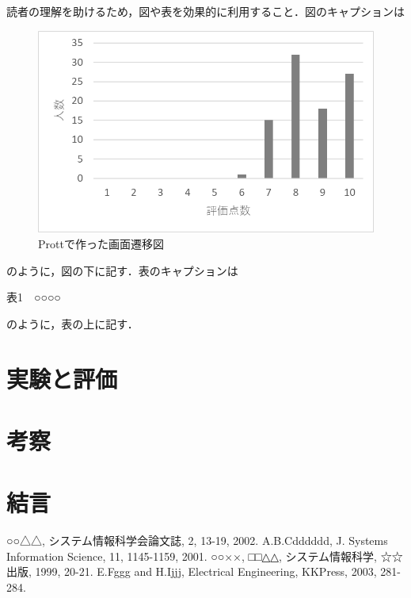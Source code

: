 \documentclass[11pt]{jarticle}
\begin{document}
読者の理解を助けるため，図や表を効果的に利用すること．図のキャプションは

\begin{figure}[H]
  \includegraphics[scale=0.5]{51.png}
  \caption{Prottで作った画面遷移図}
  \label{fig32}
\end{figure}

のように，図の下に記す．表のキャプションは

\begin{center}表1　○○○○\end{center}

のように，表の上に記す．

\section{実験と評価}

\section{考察}

\section{結言}

\begin{thebibliography}{99}
	○○△△, システム情報科学会論文誌, 2, 13-19, 2002.
	A.B.Cdddddd, J. Systems Information Science, 11, 1145-1159, 2001.
	○○××, □□△△, システム情報科学, ☆☆出版, 1999, 20-21.
	E.Fggg and H.Ijjj, Electrical Engineering, KKPress, 2003, 281-284.
\end{thebibliography}
\end{document}
